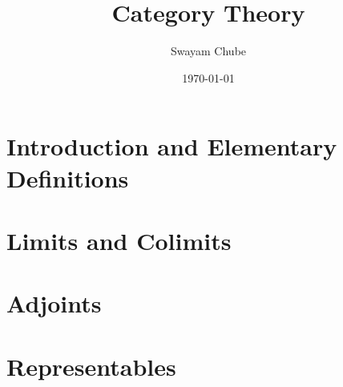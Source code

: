 \documentclass{report}
\title{Category Theory}
\author{Swayam Chube}
\date{\today}
\begin{document}
\maketitle
\tableofcontents

\chapter{Introduction and Elementary Definitions}


\chapter{Limits and Colimits}


\chapter{Adjoints}


\chapter{Representables}

\end{document}

